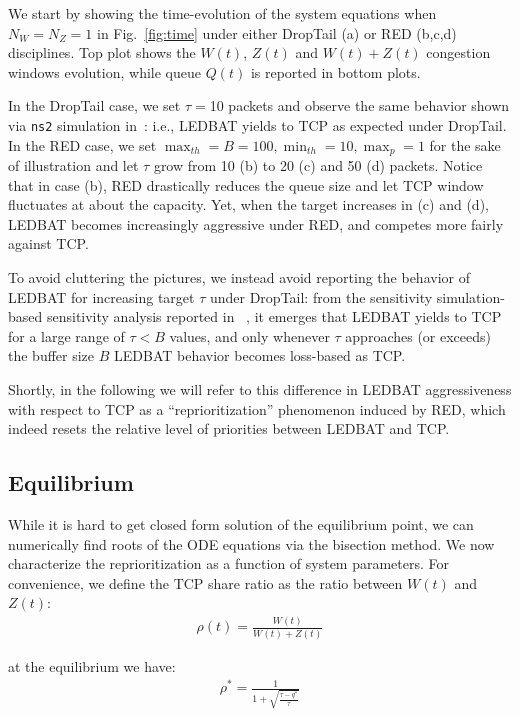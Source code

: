 \documentclass[conference]{IEEEtran}
\newcommand{\secL}[1]{\label{sec:#1}}
\newcommand{\figR}[1]{Fig.~\ref{fig:#1}}
\begin{document}
We start by showing the time-evolution of the system equations when $N_W=N_Z=1$ in \figR{time} under either DropTail (a) or RED (b,c,d) disciplines. Top plot shows the $W(t)$, $Z(t)$ and $W(t)+Z(t)$ congestion windows evolution, while queue $Q(t)$ is reported in bottom plots. 

In the DropTail case, we set $\tau=$10 packets and observe the same behavior shown via \verb!ns2! simulation in~\cite{icccn10}: i.e., LEDBAT yields to TCP as expected under DropTail.
In the RED case, we set $\max_{th}=B=100, \min_{th}=10, \max_p=1$ for the sake of illustration and let $\tau$ grow from 10 (b) to 20 (c) and 50 (d) packets.
Notice that in case (b),  RED drastically reduces the queue size and let TCP window fluctuates at about the capacity. Yet, when the target increases in (c) and (d), LEDBAT becomes increasingly aggressive under RED, and competes more fairly against TCP.

To avoid cluttering the pictures, we instead avoid reporting the behavior of LEDBAT for increasing target $\tau$ under DropTail: from the sensitivity simulation-based sensitivity analysis reported in ~\cite{lcn10}, it emerges that
LEDBAT yields to TCP for a large range of $\tau<B$ values, and only whenever $\tau$ approaches (or exceeds) the buffer size $B$ LEDBAT behavior becomes loss-based as TCP.

Shortly, in the following we will refer to this difference in LEDBAT aggressiveness with respect to TCP as a ``reprioritization'' phenomenon induced by RED, which indeed resets the relative level of priorities between LEDBAT and TCP.


\subsection{Equilibrium}\secL{equilibrium}

While it is hard to get closed form solution of the equilibrium point, we can numerically find roots of the ODE equations via the bisection method.
We now characterize the reprioritization as a function of system parameters. For convenience, we define the TCP share ratio as the ratio between $W(t)$ and $Z(t)$: 
\begin{align}
\rho(t) = \frac{W(t)}{W(t)+Z(t)}
\end{align}

\noindent at the equilibrium we have:
\begin{align}
\rho^* = \frac{1}{1 + \sqrt{\frac{\tau- q^*}{\tau}}} \label{eq:rhostar}
\end{align}
\end{document}
